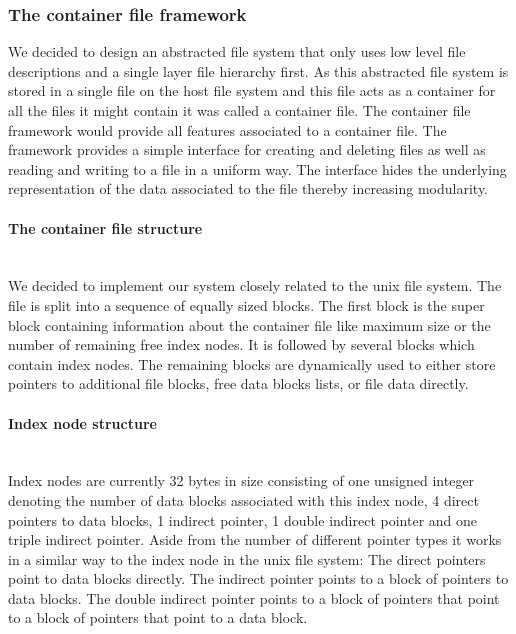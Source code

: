 \documentclass{scrartcl}
\begin{document}
\subsubsection{The container file framework}
We decided to design an abstracted file system that only uses low level file descriptions and
a single layer file hierarchy first. As this abstracted file system is stored in
a single file on the host file system and this file acts as a container for all
the files it might contain it was called a container file. The container file
framework would provide all features associated to a container file. The
framework provides a simple interface for creating and deleting files as well as
reading and writing to a file in a uniform way. The interface hides the
underlying representation of the data associated to the file thereby increasing modularity.

\paragraph{The container file structure} \ \\
We decided to implement our system closely related to the unix file system.
The file is split into a sequence of equally sized blocks. The first block is
the super block containing information about the container file like maximum
size or the number of remaining free index nodes. It is followed by several
blocks which contain index nodes. The remaining blocks are dynamically used to
either store pointers to additional file blocks, free data blocks lists, or file
data directly.

\paragraph{Index node structure} \ \\
Index nodes are currently 32 bytes in size consisting of one unsigned integer
denoting the number of data blocks associated with this index node, 4 direct
pointers to data blocks, 1 indirect pointer, 1 double indirect pointer and one
triple indirect pointer. Aside from the number of different pointer types it
works in a similar way to the index node in the unix file system:
The direct pointers point to data blocks directly. The indirect pointer points
to a block of pointers to data blocks. The double indirect pointer points to a
block of pointers that point to a block of pointers that point to a data block.
\end{document}
